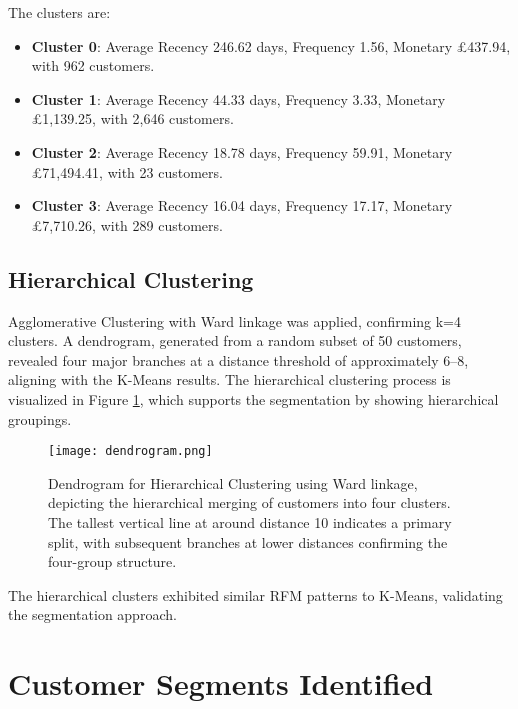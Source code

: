 \documentclass[a4paper,12pt]{article}
\begin{document}
The clusters are:
\begin{itemize}
    \item \textbf{Cluster 0}: Average Recency 246.62 days, Frequency 1.56, Monetary £437.94, with 962 customers.
    \item \textbf{Cluster 1}: Average Recency 44.33 days, Frequency 3.33, Monetary £1,139.25, with 2,646 customers.
    \item \textbf{Cluster 2}: Average Recency 18.78 days, Frequency 59.91, Monetary £71,494.41, with 23 customers.
    \item \textbf{Cluster 3}: Average Recency 16.04 days, Frequency 17.17, Monetary £7,710.26, with 289 customers.
\end{itemize}

\subsection{Hierarchical Clustering}

Agglomerative Clustering with Ward linkage was applied, confirming k=4 clusters. A dendrogram, generated from a random subset of 50 customers, revealed four major branches at a distance threshold of approximately 6–8, aligning with the K-Means results. The hierarchical clustering process is visualized in Figure \ref{fig:dendrogram}, which supports the segmentation by showing hierarchical groupings.

\begin{figure}[H]
    \centering
    \texttt{[image: dendrogram.png]}
    \caption{Dendrogram for Hierarchical Clustering using Ward linkage, depicting the hierarchical merging of customers into four clusters. The tallest vertical line at around distance 10 indicates a primary split, with subsequent branches at lower distances confirming the four-group structure.}
    \label{fig:dendrogram}
\end{figure}

The hierarchical clusters exhibited similar RFM patterns to K-Means, validating the segmentation approach.

\section{Customer Segments Identified}
\end{document}
